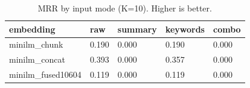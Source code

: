 \begin{table}
\caption{MRR by input mode (K=10). Higher is better.}
\label{tab:mrr-by-mode}
\begin{tabular}{lllll}
\toprule
embedding & raw & summary & keywords & combo \\
\midrule
minilm_chunk & 0.190 & 0.000 & 0.190 & 0.000 \\
minilm_concat & 0.393 & 0.000 & 0.357 & 0.000 \\
minilm_fused10604 & 0.119 & 0.000 & 0.119 & 0.000 \\
\bottomrule
\end{tabular}
\end{table}
